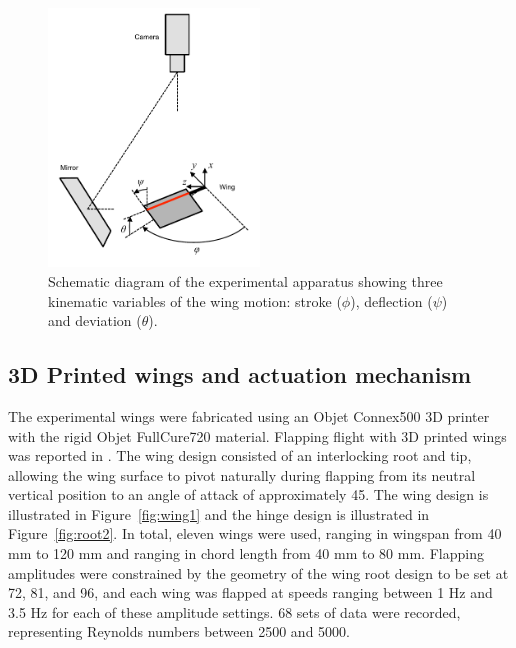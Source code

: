 \documentclass{article}
\begin{document}

\begin{figure}
\centering
\includegraphics[trim=0 15 0 5, clip, width=0.5\textwidth]{figures/apparatus}
\caption{Schematic diagram of the experimental apparatus
  showing three kinematic variables of the wing motion: stroke ($\phi$),
  deflection ($\psi$) and deviation ($\theta$).\label{fig:apparatus}}
\end{figure}


\subsection*{3D Printed wings and actuation mechanism}
The experimental wings were fabricated using an Objet Connex500 3D printer with
the rigid Objet FullCure720 material.  Flapping flight with 3D printed wings was
reported in \cite{richter2011untethered}. The wing design consisted of an
interlocking root and tip, allowing the wing surface to pivot naturally during
flapping from its neutral vertical position to an angle of attack of
approximately 45\textdegree. The wing design is illustrated in
Figure~\ref{fig:wing1} and the hinge design is illustrated in
Figure~\ref{fig:root2}.  In total, eleven wings were used, ranging in wingspan
from 40 mm to 120 mm and ranging in chord length from 40 mm to 80 mm. Flapping
amplitudes were constrained by the geometry of the wing root design to be set at
72\textdegree, 81\textdegree, and 96\textdegree, and each wing was flapped at
speeds ranging between 1 Hz and 3.5 Hz for each of these amplitude settings.  68
sets of data were recorded, representing Reynolds numbers between 2500 and 5000.
\end{document}
